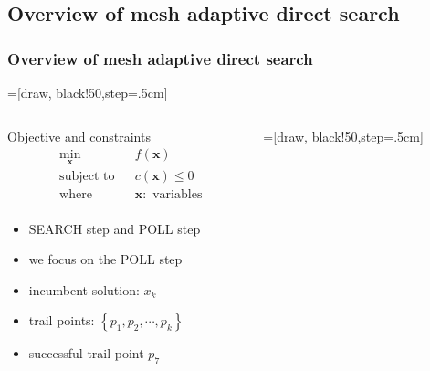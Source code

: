 \subsection{Overview of mesh adaptive direct search}
\begin{frame}[t,label=abm_5]
	\frametitle{Overview of mesh adaptive direct search}
	=[draw, black!50,step=.5cm]
	\\
	\begin{columns}[t] %
		\begin{column}{.42\textwidth} %
			\vspace{-1.2em}
			\begin{exampleblock}{Objective and constraints}
				\begin{equation*}
					\begin{aligned}
						& \underset{\mathbf{x}}{\text{min}}
						& & f(\mathbf{x})\\
						& \text{subject to}
						& & {c}(\mathbf{x}) \le 0\\
						& \text{where}
						& & \mathbf{x}:\text{ variables}\\
					\end{aligned}
				\end{equation*}
			\end{exampleblock}

			\small
			\begin{itemize}\itemsep0em
				\item SEARCH step and POLL step
				\item<2-> we focus on the POLL step
				\item<3-> incumbent solution: $x_k$
				\item<4-> trail points: $\left\{p_1,p_2,\cdots,p_k\right\}$
				\item<10-> successful trail point $p_7$
			\end{itemize}
		\end{column}
		\begin{column}{.5\textwidth} %
			=[draw, black!50,step=.5cm]
			
			\only<3>{\def\frameopt{-1}}%
			\only<4>{\def\frameopt{0}}%
			\only<5>{\def\frameopt{1}}%
			\only<6>{\def\frameopt{2}}%
			\only<7>{\def\frameopt{3}}%
			\only<8>{\def\frameopt{4}}%
			\only<9>{\def\frameopt{5}}%
			\only<10>{\def\frameopt{6}}%
			\only<11>{\def\frameopt{7}}%
			\only<12>{\def\frameopt{8}}%
			\only<13>{\def\frameopt{9}}%


\end{column}
\end{columns}
\end{frame}
